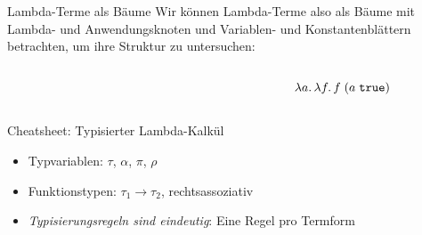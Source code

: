 \documentclass{beamer}
\begin{document}
\begin{frame}{Lambda-Terme als Bäume}
  Wir können Lambda-Terme also als Bäume mit Lambda- und Anwendungsknoten und Variablen- und Konstantenblättern betrachten, um ihre Struktur zu untersuchen:

  \begin{columns}
    \begin{column}{0.5\textwidth}
      \begin{figure}
      \end{figure}
    \end{column}
    \begin{column}{0.35\textwidth}
      \begin{equation*}
        \lambda a.\, \lambda f.\, f\;(a\;\texttt{true})
      \end{equation*}
    \end{column}
  \end{columns}
\end{frame}

\begin{frame}{Cheatsheet: Typisierter Lambda-Kalkül}

  \begin{itemize}
    \item Typvariablen: $\tau$, $\alpha$, $\pi$, $\rho$
    \item Funktionstypen: $\tau_1 \to \tau_2$, rechtsassoziativ
    \item \emph{Typisierungsregeln sind eindeutig}: Eine Regel pro Termform
  \end{itemize}
\end{frame}
\end{document}
